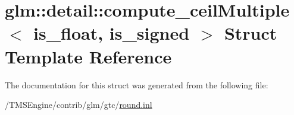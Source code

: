 \hypertarget{structglm_1_1detail_1_1compute__ceil_multiple}{}\section{glm\+:\+:detail\+:\+:compute\+\_\+ceil\+Multiple$<$ is\+\_\+float, is\+\_\+signed $>$ Struct Template Reference}
\label{structglm_1_1detail_1_1compute__ceil_multiple}


The documentation for this struct was generated from the following file\+:\begin{DoxyCompactItemize}
\item 
/\+T\+M\+S\+Engine/contrib/glm/gtc/\hyperlink{round_8inl}{round.\+inl}\end{DoxyCompactItemize}
